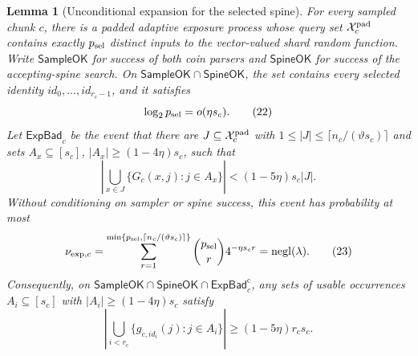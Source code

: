 \documentclass[11pt]{article}
\newtheorem{lemma}{Lemma}[section]
\begin{document}
\begin{lemma}[Unconditional expansion for the selected spine]
\label{lem:deferred}
For every sampled chunk $c$, there is a padded adaptive exposure process whose
query set $\mathcal X_c^{\rm pad}$ contains exactly $p_{\rm sel}$ distinct
inputs to the vector-valued shard random function.  Write
$\mathsf{SampleOK}$ for success of both coin parsers and $\mathsf{SpineOK}$
for success of the accepting-spine search.  On
$\mathsf{SampleOK}\cap\mathsf{SpineOK}$, the set contains every selected
identity $\mathit{id}_0,\ldots,\mathit{id}_{r_c-1}$, and it satisfies
\[
 \log_2p_{\rm sel}=o(\eta s_c).
\tag{22}\label{eq:exposure-budget}
\]
Let $\mathsf{ExpBad}_c$ be the event that there are
$J\subseteq\mathcal X_c^{\rm pad}$ with
$1\le|J|\le\lceil n_c/(\vartheta s_c)\rceil$ and sets
$A_x\subseteq[s_c]$, $|A_x|\ge(1-4\eta)s_c$, such that
\[
 \left|\bigcup_{x\in J}\{G_c(x,j):j\in A_x\}\right|
 <(1-5\eta)s_c|J|.
\]
Without conditioning on sampler or spine success, this event has
probability at most
\[
 \nu_{{\rm exp},c}=
 \sum_{r=1}^{\min\{p_{\rm sel},\lceil n_c/(\vartheta s_c)\rceil\}}
 \binom{p_{\rm sel}}r4^{-\eta s_cr}
 =\operatorname{negl}(\lambda).
\tag{23}\label{eq:exposure-failure}
\]
Consequently, on
$\mathsf{SampleOK}\cap\mathsf{SpineOK}\cap
\mathsf{ExpBad}_c^{\mathrm c}$, any sets of usable occurrences
$A_i\subseteq[s_c]$ with $|A_i|\ge(1-4\eta)s_c$ satisfy
\[
 \left|\bigcup_{i<r_c}
 \{g_{c,\mathit{id}_i}(j):j\in A_i\}\right|
 \ge(1-5\eta)r_cs_c.
\tag{24}\label{eq:selected-expansion}
\]
\end{lemma}
\end{document}
